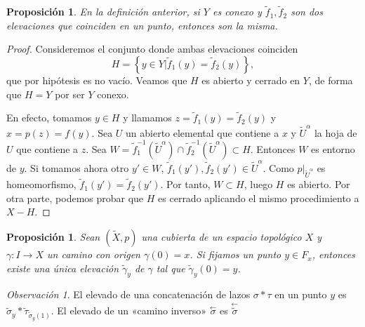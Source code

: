 \documentclass[12pt,a4paper]{book}
\newtheorem{prop}[thm]{Proposición}
\theoremstyle{definition} \newtheorem{defn}[thm]{Definición}
\theoremstyle{definition} \newtheorem{ejemplo}[thm]{Ejemplo}
\theoremstyle{definition} \newtheorem{ejercicio}[thm]{Ejercicio}
\theoremstyle{remark} \newtheorem*{obs}{Observación}
\def\XX{\tilde{X}}
\newcommand\cev[1]{\overset{\leftarrow}{#1}}
\begin{document}
\begin{prop}\label{coinciden}
  En la definición anterior, si $Y$ es conexo y $\tilde{f}_1,\tilde{f}_2$ son dos elevaciones que coinciden en un punto, entonces son la misma.
\end{prop}
\begin{proof}
  Consideremos el conjunto donde ambas elevaciones coinciden
  \begin{equation*}
    H=\left\{ y\in Y | \tilde{f}_1(y)=\tilde{f}_2(y) \right\},
  \end{equation*}
  que por hipótesis es no vacío. Veamos que $H$ es abierto y cerrado en $Y$, de forma que $H=Y$ por ser $Y$ conexo.

  En efecto, tomamos $y\in H$ y llamamos $z=\tilde{f}_1(y)=\tilde{f}_2(y)$ y $x=p(z)=f(y)$. Sea $U$ un abierto elemental que contiene a $x$ y $\tilde{U}^{\alpha}$ la hoja de $U$ que contiene a $z$. Sea $W=\tilde{f}_1^{-1}(\tilde{U}^{\alpha}) \cap \tilde{f}_2^{-1}(\tilde{U}^{\alpha})\subset H$. Entonces $W$ es entorno de $y$. Si tomamos ahora otro $y'\in W$, $\tilde{f}_1(y'),\tilde{f}_2(y') \in \tilde{U}^{\alpha}$. Como $p|_{\tilde{U}^{\alpha}}$ es homeomorfismo, $\tilde{f}_1(y')=\tilde{f}_2(y')$. Por tanto, $W\subset H$, luego $H$ es abierto.
  Por otra parte, podemos probar que $H$ es cerrado aplicando el mismo procedimiento a $X-H$.
\end{proof}

\begin{prop}
  Sean $(\XX,p)$ una cubierta de un espacio topológico $X$ y $\gamma:I\rightarrow X$ un camino con origen $\gamma(0)=x$. Si fijamos un punto $y\in F_{x}$, entonces existe una única elevación $\tilde{\gamma}_{y}$ de $\gamma$ tal que $\tilde{\gamma}_{y}(0)=y$. 
\end{prop}

\begin{obs}
  El elevado de una concatenación de lazos $\sigma*\tau$ en un punto $y$ es $\tilde{\sigma}_y*\tilde{\tau}_{\tilde{\sigma}_y(1)}$. El elevado de un «camino inverso» $\cev{\sigma}$ es $\cev{\tilde{\sigma}}$
\end{obs}
\end{document}
